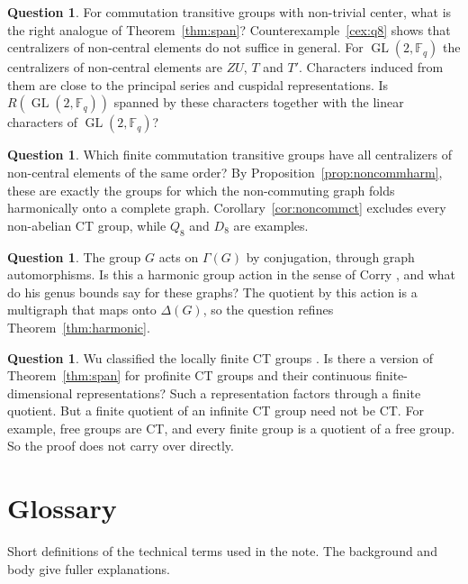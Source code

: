 \documentclass[12pt,letterpaper]{article}
\numberwithin{equation}{section}
\theoremstyle{plain}
\theoremstyle{definition}
\newtheorem{question}[theorem]{Question}
\newcommand{\F}{\mathbb{F}}
\DeclareMathOperator{\GL}{GL}
\begin{document}
\begin{question}\label{q:gl2}
For commutation transitive groups with non-trivial center, what is the right
analogue of Theorem~\ref{thm:span}? Counterexample~\ref{cex:q8} shows that
centralizers of non-central elements do not suffice in general. For
$\GL(2,\F_q)$ the centralizers of non-central elements are $ZU$, $T$ and
$T'$. Characters induced from them are close to the principal series and
cuspidal representations. Is $R(\GL(2,\F_q))$ spanned by these characters
together with the linear characters of $\GL(2,\F_q)$?
\end{question}

\begin{question}\label{q:equalcent}
Which finite commutation transitive groups have all centralizers of
non-central elements of the same order? By
Proposition~\ref{prop:noncommharm}, these are exactly the groups for which
the non-commuting graph folds harmonically onto a complete graph.
Corollary~\ref{cor:noncommct} excludes every non-abelian CT group, while
$Q_8$ and $D_8$ are examples.
\end{question}

\begin{question}\label{q:corry}
The group $G$ acts on $\Gamma(G)$ by conjugation, through graph
automorphisms. Is this a harmonic group action in the sense of Corry
\cite{Co10}, and what do his genus bounds say for these graphs? The quotient
by this action is a multigraph that maps onto $\Delta(G)$, so the question
refines Theorem~\ref{thm:harmonic}.
\end{question}

\begin{question}\label{q:profinite}
Wu classified the locally finite CT groups \cite{Wu98}. Is there a version
of Theorem~\ref{thm:span} for profinite CT groups and their continuous
finite-dimensional representations? Such a representation factors through a
finite quotient. But a finite quotient of an infinite CT group need not be
CT. For example, free groups are CT, and every finite group is a quotient of
a free group. So the proof does not carry over directly.
\end{question}

\section{Glossary}\label{sec:glossary}

Short definitions of the technical terms used in the note. The background
and body give fuller explanations.
\end{document}
